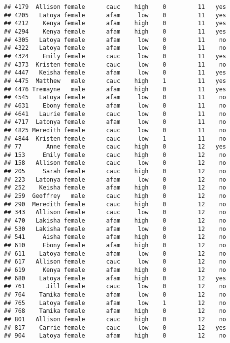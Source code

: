 \documentclass[
]{article}
\begin{document}
\begin{verbatim}
## 4179  Allison female      cauc    high    0         11   yes
## 4205   Latoya female      afam     low    0         11   yes
## 4212    Kenya female      afam    high    0         11   yes
## 4294    Kenya female      afam    high    0         11   yes
## 4305   Latoya female      afam     low    0         11    no
## 4322   Latoya female      afam     low    0         11    no
## 4324    Emily female      cauc     low    0         11   yes
## 4373  Kristen female      cauc     low    0         11    no
## 4447   Keisha female      afam     low    0         11   yes
## 4475  Matthew   male      cauc    high    1         11   yes
## 4476 Tremayne   male      afam    high    0         11   yes
## 4545   Latoya female      afam     low    0         11    no
## 4631    Ebony female      afam     low    0         11    no
## 4641   Laurie female      cauc     low    0         11    no
## 4717  Latonya female      afam     low    0         11    no
## 4825 Meredith female      cauc     low    0         11    no
## 4844  Kristen female      cauc     low    1         11    no
## 77       Anne female      cauc    high    0         12   yes
## 153     Emily female      cauc    high    0         12    no
## 158   Allison female      cauc     low    0         12    no
## 205     Sarah female      cauc    high    0         12    no
## 223   Latonya female      afam     low    0         12    no
## 252    Keisha female      afam    high    0         12    no
## 259  Geoffrey   male      cauc    high    0         12    no
## 290  Meredith female      cauc    high    0         12    no
## 343   Allison female      cauc     low    0         12    no
## 470   Lakisha female      afam    high    0         12    no
## 530   Lakisha female      afam     low    0         12    no
## 541     Aisha female      afam    high    0         12    no
## 610     Ebony female      afam    high    0         12    no
## 611    Latoya female      afam     low    0         12    no
## 617   Allison female      cauc     low    0         12    no
## 619     Kenya female      afam    high    0         12    no
## 680    Latoya female      afam    high    0         12   yes
## 761      Jill female      cauc     low    0         12    no
## 764    Tamika female      afam     low    0         12    no
## 765    Latoya female      afam     low    1         12    no
## 768    Tamika female      afam    high    0         12    no
## 801   Allison female      cauc    high    0         12    no
## 817    Carrie female      cauc     low    0         12   yes
## 904    Latoya female      afam    high    0         12    no

\end{verbatim}
\end{document}
